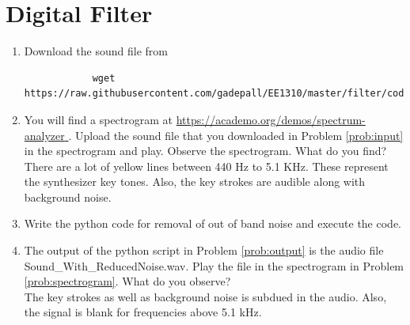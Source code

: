 \documentclass[journal,12pt,twocolumn]{IEEEtran}
\renewcommand\thesection{\arabic{section}}
\begin{document}
	\section{Digital Filter}
	\begin{enumerate}[label=\thesection.\arabic*
		,ref=\thesection.\theenumi]
		\item
		\label{prob:input}
		Download the sound file from  
		\begin{lstlisting}
			wget https://raw.githubusercontent.com/gadepall/EE1310/master/filter/codes/Sound_Noise.wav
		\end{lstlisting}
		\item
		\label{prob:spectrogram}
		You will find a spectrogram at \href{https://academo.org/demos/spectrum-analyzer}{\url{https://academo.org/demos/spectrum-analyzer} }. 
		Upload the sound file that you downloaded in Problem \ref{prob:input} in the spectrogram  and play.  Observe the spectrogram. What do you find?
		\\
		\solution There are a lot of yellow lines between 440 Hz to 5.1 KHz.  These represent the synthesizer key tones. Also, the key strokes
		are audible along with background noise.
		\item
		\label{prob:output}
		Write the python code for removal of out of band noise and execute the code.
		\\
		\solution
% 		
		\item
		The output of the python script in Problem \ref{prob:output} is the audio file Sound\_With\_ReducedNoise.wav. Play the file in the spectrogram in Problem \ref{prob:spectrogram}. What do you observe?
		\\
		\solution The key strokes as well as background noise is subdued in the audio.  Also,  the signal is blank for frequencies above 5.1 kHz.
		
	\end{enumerate}
\end{document}
